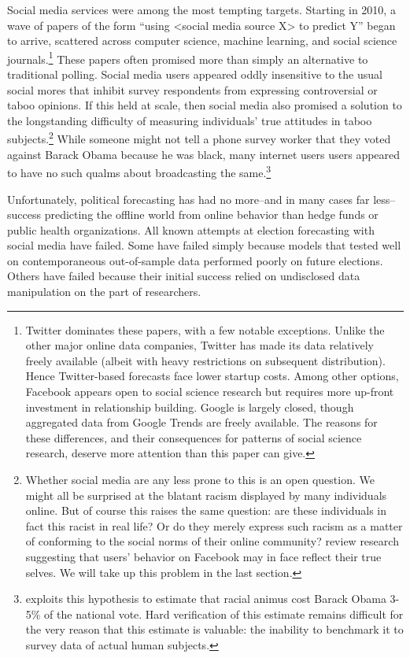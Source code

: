 \documentclass{article}
\begin{document}
Social media services were among the most tempting
targets. Starting in 2010, a wave of papers of the form ``using
<social media source X> to predict Y'' began to
arrive, scattered across computer science, machine learning, and
social science journals.\footnote{Twitter dominates these papers, with a few notable
  exceptions. Unlike the other major online data companies, Twitter has made
  its data relatively freely available (albeit with heavy restrictions
  on subsequent distribution). Hence Twitter-based forecasts face
  lower startup costs. Among other options, Facebook appears open to
  social science research but requires more up-front investment in
  relationship building. Google is largely closed, though aggregated
  data from Google Trends are freely available. The reasons for these
  differences, and their consequences for patterns of social science
  research, deserve more attention than this paper can give.}
These papers often promised more than simply an
alternative to traditional polling. Social media users appeared oddly
insensitive to the usual social mores that inhibit survey respondents from expressing
controversial or taboo opinions. If this held at scale, then social
media also promised a solution to the longstanding
difficulty of measuring individuals' true attitudes in taboo
subjects.\footnote{Whether social media are any less prone to this
is an open question. We might all be surprised at the blatant racism
displayed by many individuals online. But of course this raises the
same question: are these individuals in fact this racist in real life?
Or do they merely express such racism as a matter of conforming to the
social norms of their online community? \cite{wilson2012review}
review research suggesting that users' behavior on Facebook may in
face reflect their true selves.  We will take up this problem
in the last section.}  While someone might not tell a phone survey worker that they
voted against Barack Obama because he was black, many internet users
users appeared to have no such qualms about broadcasting the
same.\footnote{\cite{stephens2013cost} exploits this hypothesis to
  estimate that racial animus cost Barack Obama 3-5\% of the national
  vote. Hard verification of this estimate remains difficult for the
  very reason that this estimate is valuable: the inability to
  benchmark it to survey data of actual human subjects.}

Unfortunately, political forecasting has had no more--and in many
cases far less--success predicting the offline world from online
behavior than hedge funds or public health organizations. All known
attempts at election forecasting with social media have failed. Some
have failed simply because models that tested well on contemporaneous
out-of-sample data performed poorly on future elections. Others have
failed because their initial success relied on undisclosed data
manipulation on the part of researchers.
\end{document}
